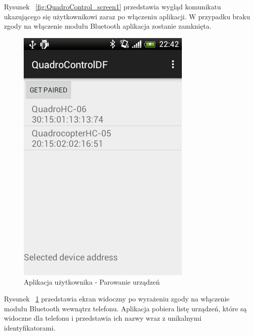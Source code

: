 Rysunek ~\ref{fig:QuadroControl_screen1} przedstawia wygląd komunikatu ukazującego się użytkownikowi zaraz po włączeniu aplikacji. W przypadku braku zgody na włączenie modułu Bluetooth aplikacja zostanie zamknięta.

\begin{figure}[H]
	\centering
	\includegraphics[scale=0.6]{Pictures/DroidAtScreen/droid@screen-2.png}
	\caption[Aplikacja użytkownika - Parowanie urządzeń]{Aplikacja użytkownika - Parowanie urządzeń}
	\label{fig:QuadroControl_screen2}
\end{figure}

Rysunek ~\ref{fig:QuadroControl_screen2} przedstawia ekran widoczny po wyrażeniu zgody na włączenie modułu Bluetooth wewnątrz telefonu. Aplikacja pobiera listę urządzeń, które są widoczne dla telefonu i przedstawia ich nazwy wraz z unikalnymi identyfikatorami. 

